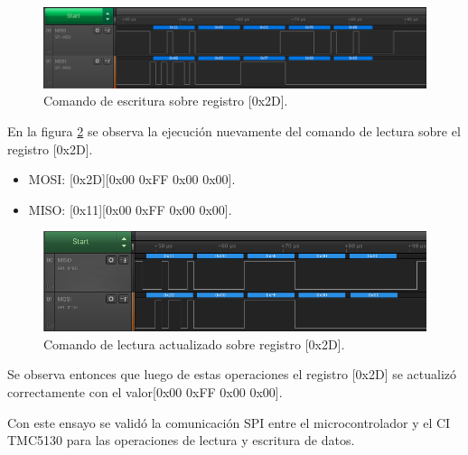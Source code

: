 \begin{figure}[h]
\centering 
\includegraphics[width=1\textwidth]{./Figures/ensayo_spi_b.png}
\caption{Comando de escritura sobre registro [0x2D].}
\label{fig:ensayo_spi_b}
\end{figure}

En la figura \ref{fig:ensayo_spi_c} se observa la ejecución nuevamente del comando de lectura sobre el registro [0x2D].

\begin{itemize}
\item MOSI: [0x2D][0x00 0xFF 0x00 0x00].
\item MISO: [0x11][0x00 0xFF 0x00 0x00].
\end{itemize}


\begin{figure}[h!]
\centering 
\includegraphics[width=1\textwidth]{./Figures/ensayo_spi_c_c.png}
\caption{Comando de lectura actualizado sobre registro [0x2D].}
\label{fig:ensayo_spi_c}
\end{figure}

Se observa entonces que luego de estas operaciones el registro [0x2D] se actualizó correctamente con el valor[0x00 0xFF 0x00 0x00].

Con este ensayo se validó la comunicación SPI entre el microcontrolador y el CI TMC5130 para las operaciones de lectura y escritura de datos.




